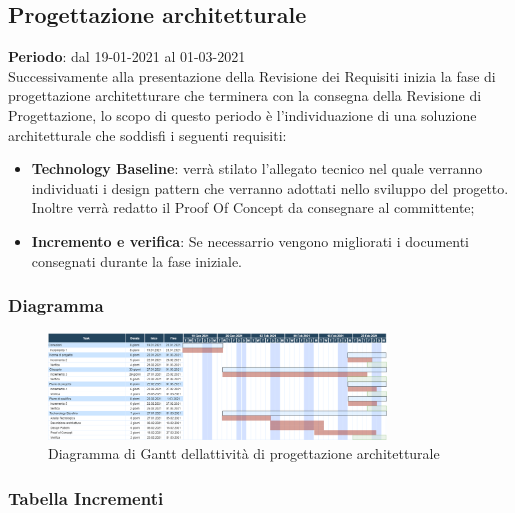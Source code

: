 	\subsection{Progettazione architetturale}
	\textbf{Periodo}: dal 19-01-2021 al 01-03-2021 \\
	Successivamente alla presentazione della Revisione dei Requisiti inizia la fase di progettazione architetturare che terminera con la consegna della Revisione di Progettazione, lo scopo di questo periodo è l'individuazione di una soluzione architetturale che soddisfi i seguenti requisiti:
	\begin{itemize}
		\item \textbf{Technology Baseline}: verrà stilato l'allegato tecnico nel quale verranno individuati i design pattern che verranno adottati nello sviluppo del progetto. Inoltre verrà redatto il Proof Of Concept da consegnare al committente;
		\item \textbf{Incremento e verifica}: Se necessarrio vengono migliorati i documenti consegnati durante la fase iniziale.
	\end{itemize}
	
	\subsubsection{Diagramma}
		\begin{figure}[H]
        		\centering
        		\includegraphics[width=0.8\textwidth]{source/img/Progettazione_architetturale.png}
        		\caption{Diagramma di Gantt dell\textquotesingle attività di progettazione architetturale}
    		\end{figure}
	\subsubsection{Tabella Incrementi}
		\def\tabellaincrementi{
    			{
        			Incremento 1,
        			19-01-2021, 
				26-01-2021,
        			Ricevuto il feedback del committente i prodotti consegnati nella fase precedente verranno aggiornati e corretti per migliorare la qualità del prodotto
    			},
		}
		
	
